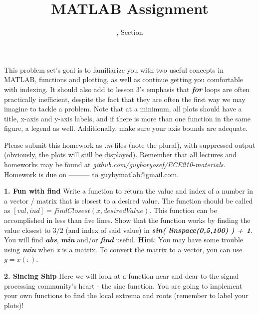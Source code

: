 \documentclass[11pt]{article}
\title{MATLAB Assignment \Homework}
\author{\Session, Section \Section}
\date{}
\makeatletter
\def\MyEmail{guybymatlab@gmail.com}
\def\DateOfSubmission{ --------- }
\makeatother
\begin{document}
\maketitle
This problem set's goal is to familiarize you with two useful concepts in MATLAB,
functions and plotting, as well as continue getting you comfortable with indexing.
It should also add to lesson 3's emphasis that
\textit{\textbf{for}} loops are often practically inefficient,
despite the fact that they are often the
first way we may imagine to tackle a problem.
Note that at a minimum, all plots should have a title, x-axis and y-axis labels,
and if there is more than one function in the same figure, a legend as well.
Additionally, make sure your axis bounds are adequate. 

Please submit this homework as \textit{.m} files (note the plural), 
with suppressed output (obviously, the plots will still be displayed).
Remember that all lectures and homeworks may be found at 
\textit{github.com/guybaryosef/ECE210-materials}.
Homework is due on \DateOfSubmission to \MyEmail. 

\noindent
\newline
\textbf{1. Fun with find}
Write a function to return the value and index of a number in a 
vector / matrix that is closest to a desired value.
The function should be called as $[val, ind] = findClosest(x, desiredValue)$.
This function can be accomplished in less than five lines.
Show that the function works by finding the value closest to $3/2$
(and index of said value) in \textbf{\textit{sin( linspace(0,5,100) ) + 1}}.
You will find \textbf{\textit{abs}}, \textbf{\textit{min}} and/or \textbf{\textit{find}} useful.
\textbf{Hint}: You may have some trouble using \textbf{\textit{min}} when \textit{x} is a matrix.
To convert the matrix to a vector, you can use $y = x(:)$.

\noindent
\newline
\textbf{2. Sincing Ship} 
Here we will look at a function near and dear to the signal processing community's heart -
the sinc function.
You are going to implement your own functions to find the local extrema and roots
(remember to label your plots)!
\end{document}
